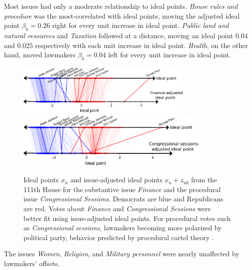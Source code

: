 Most issues had only a moderate relationship to ideal points.
\emph{House rules and procedure} was the most-correlated with ideal
points, moving the adjusted ideal point $\beta_k=0.26$ right for every
unit increase in ideal point. \emph{Public land and natural resources} and
\emph{Taxation} followed at a distance, moving an ideal point $0.04$
and $0.025$ respectively with each unit increase in ideal point.
\emph{Health}, on the other hand, moved lawmakers $\beta_k=0.04$ left
for every unit increase in ideal point.
\begin{figure}[t]
  \center
  \includegraphics[width=0.77\textwidth]{chapter_inferring_issue_preferences/figures/3393_example_ideal_points_finance.pdf}
  \vspace{-10pt}
  \includegraphics[width=0.85\textwidth]{chapter_inferring_issue_preferences/figures/3393_example_ideal_points_congressional_sessions.pdf}
  \caption{Ideal points $x_u$ and issue-adjusted ideal points $x_u +
    z_{uk}$ from the 111th House for the substantive issue
    \emph{Finance} and the procedural issue \emph{Congressional
      Sessions}. Democrats are blue and Republicans are red.  Votes
    about \emph{Finance} and \emph{Congressional Sessions} were better
    fit using issue-adjusted ideal points.  For procedural votes such
    as \emph{Congressional sessions}, lawmakers becoming more
    polarized by political party, behavior predicted by procedural
    cartel theory \citep{cox:1993}. }
  \label{fig:issue_improvements_ideals}
  \vspace{-5pt}
\end{figure}
The issues \emph{Women}, \emph{Religion}, and \emph{Military
personnel} were nearly unaffected by lawmakers' offsets.

